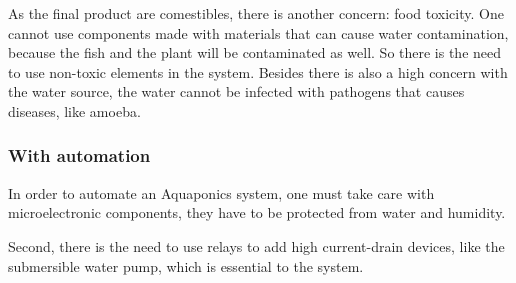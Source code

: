 As the final product are comestibles,
there is another concern: food toxicity.
One cannot use components made with materials that can cause water contamination,
because the fish and the plant will be contaminated as well.
So there is the need to use non-toxic elements in the system.
Besides there is also a high concern with the water source,
the water cannot be infected with pathogens that causes diseases,
like amoeba.

\subsubsection{With automation}
In order to automate an Aquaponics system,
one must take care with microelectronic components,
they have to be protected from water and humidity.

Second,
there is the need to use relays to add high current-drain devices,
like the submersible water pump,
which is essential to the system.
